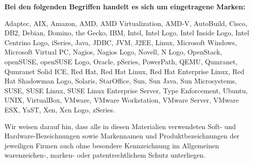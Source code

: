 \textbf{Bei den folgenden Begriffen handelt es sich um eingetragene Marken:}

\vspace{0.2cm}

Adaptec, AIX, Amazon, AMD, AMD Virtualization, AMD-V, AutoBuild, Cisco, DB2, Debian, Domino, the Gecko, IBM, Intel, Intel Logo, Intel Inside Logo, Intel Centrino Logo, iSeries, Java, JDBC, JVM, J2EE, Linux, Microsoft Windows, Microsoft Virtual PC, Nagios, Nagios Logo, Novell, N Logo, OpenStack, openSUSE, openSUSE Logo, Oracle, pSeries, PowerPath, QEMU, Qumranet, Qumranet Solid ICE, Red Hat, Red Hat Linux, Red Hat Enterprise Linux, Red Hat Shadowman Logo, Solaris, StarOffice, Sun, Sun Java, Sun Microsystems, SUSE, SUSE Linux, SUSE Linux Enterprise Server, Type Enforcement, Ubuntu, UNIX, VirtualBox, VMware, VMware Workstation, VMware Server, VMware ESX, YaST, Xen, Xen Logo, zSeries.

\vspace{0.5cm}


Wir weisen darauf hin, dass alle in diesen Materialien verwendeten Soft- und Hardware-Bezeichnungen sowie Markennamen und Produktbezeichnungen der jeweiligen Firmen auch ohne besondere Kennzeichnung im Allgemeinen warenzeichen-, marken- oder patentrechtlichem Schutz unterliegen.
